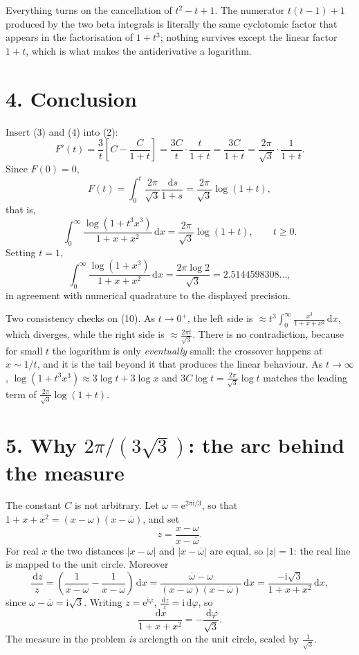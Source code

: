 \documentclass[12pt]{article}
\newcommand{\dd}{\,\mathrm{d}}
\newcommand{\ii}{\mathrm{i}}
\newcommand{\e}{\mathrm{e}}
\newcommand{\om}{\omega}
\begin{document}
Everything turns on the cancellation of \(t^2-t+1\). The numerator
\(t(t-1)+1\) produced by the two beta integrals is literally the same
cyclotomic factor that appears in the factorisation of \(1+t^3\); nothing
survives except the linear factor \(1+t\), which is what makes the
antiderivative a logarithm.

\section*{4. Conclusion}

Insert (3) and (4) into (2):
\[
F'(t)=\frac3t\left[C-\frac{C}{1+t}\right]
=\frac{3C}{t}\cdot\frac{t}{1+t}
=\frac{3C}{1+t}
=\frac{2\pi}{\sqrt3}\cdot\frac1{1+t}.
\tag{9}
\]
Since \(F(0)=0\),
\[
F(t)=\int_0^t\frac{2\pi}{\sqrt3}\frac{\dd s}{1+s}
=\frac{2\pi}{\sqrt3}\log(1+t),
\]
that is,
\[
\boxed{\displaystyle
\int_0^\infty\frac{\log(1+t^3x^3)}{1+x+x^2}\dd x
=\frac{2\pi}{\sqrt3}\log(1+t),\qquad t\ge0 .}
\tag{10}
\]
Setting \(t=1\),
\[
\int_0^\infty\frac{\log(1+x^3)}{1+x+x^2}\dd x=\frac{2\pi\log2}{\sqrt3}
=2.5144598308\ldots,
\]
in agreement with numerical quadrature to the displayed precision.

Two consistency checks on (10). As \(t\to0^+\), the left side is
\(\approx t^3\int_0^\infty\frac{x^3}{1+x+x^2}\dd x\), which diverges,
while the right side is \(\approx\frac{2\pi t}{\sqrt3}\). There is no
contradiction, because for small \(t\) the logarithm is only
\emph{eventually} small: the crossover happens at \(x\sim1/t\), and it is
the tail beyond it that produces the linear behaviour. As
\(t\to\infty\), \(\log(1+t^3x^3)\approx3\log t+3\log x\) and
\(3C\log t=\frac{2\pi}{\sqrt3}\log t\) matches the leading term of
\(\frac{2\pi}{\sqrt3}\log(1+t)\).

\section*{5. Why \(2\pi/(3\sqrt3)\): the arc behind the measure}

The constant \(C\) is not arbitrary. Let \(\om=\e^{2\pi\ii/3}\), so that
\(1+x+x^2=(x-\om)(x-\overline\om)\), and set
\[
z=\frac{x-\om}{x-\overline\om}.
\]
For real \(x\) the two distances \(|x-\om|\) and \(|x-\overline\om|\) are
equal, so \(|z|=1\): the real line is mapped to the unit circle. Moreover
\[
\frac{\dd z}{z}
=\left(\frac1{x-\om}-\frac1{x-\overline\om}\right)\dd x
=\frac{\overline\om-\om}{(x-\om)(x-\overline\om)}\dd x
=\frac{-\ii\sqrt3}{1+x+x^2}\dd x,
\]
since \(\om-\overline\om=\ii\sqrt3\). Writing \(z=\e^{\ii\varphi}\),
\(\frac{\dd z}{z}=\ii\dd\varphi\), so
\[
\boxed{\displaystyle
\frac{\dd x}{1+x+x^2}=-\frac{\dd\varphi}{\sqrt3}.}
\tag{11}
\]
The measure in the problem \emph{is} arclength on the unit circle, scaled
by \(\frac1{\sqrt3}\).
\end{document}
